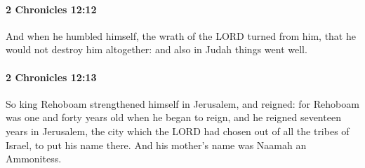 		\paragraph{2 Chronicles 12:12} %
			\label{2CHRONICLES-12-12}

			And when he humbled himself, the wrath of the LORD turned from him, that he would not destroy him altogether: and also in Judah things went well.


		\paragraph{2 Chronicles 12:13} %
			\label{2CHRONICLES-12-13}

			So king Rehoboam strengthened himself in Jerusalem, and reigned: for Rehoboam was one and forty years old when he began to reign, and he reigned seventeen years in Jerusalem, the city which the LORD had chosen out of all the tribes of Israel, to put his name there. And his mother's name was Naamah an Ammonitess.

